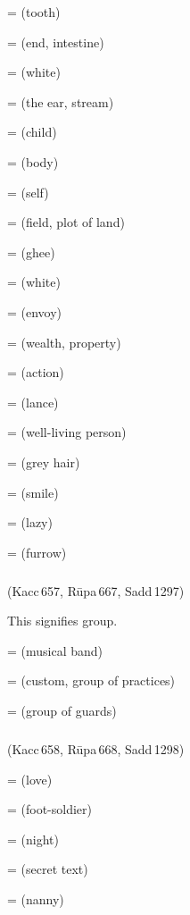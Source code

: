  =  (tooth)\par
{} =  (end, intestine)\par
{} =  (white)\par
{} =  (the ear, stream)\par
{} =  (child)\par
{} =  (body)\par
{} =  (self)\par
{} =  (field, plot of land)\par
{} =  (ghee)\par
{} =  (white)\par
{} =  (envoy)\par
{} =  (wealth, property)\par
{} =  (action)\par
{} =  (lance)\par
{} =  (well-living person)\par
{} =  (grey hair)\par
{} =  (smile)\par
{} =  (lazy)\par
{} =  (furrow)\par

\subparagraph*{} (Kacc\,657, R\=upa\,667, Sadd\,1297)\label{pacckx:dnitta}

This  signifies group.

 =  (musical band)\par
{} =  (custom, group of practices)\par
{} =  (group of guards)\par

\subparagraph*{} (Kacc\,658, R\=upa\,668, Sadd\,1298)\label{pacckx:tti}\label{pacckx:ti}

 =  (love)\par
{} =  (foot-soldier)\par
{} =  (night)\par
{} =  (secret text)\par
{} =  (nanny)\par

